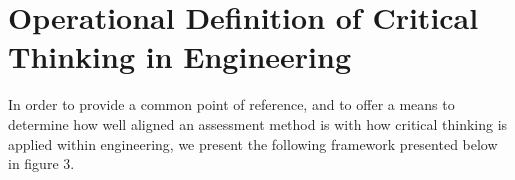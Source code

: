 \section{Operational Definition of Critical Thinking in Engineering}

In order to provide a common point of reference, and to offer a means to determine how well aligned an assessment method is with how critical thinking is applied within engineering, we present the following framework presented below in figure 3.

